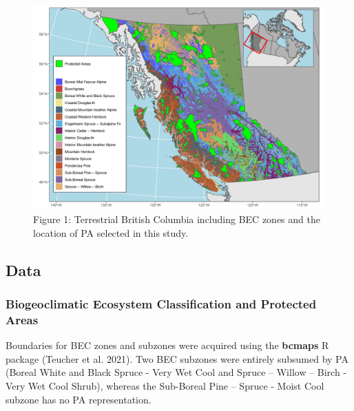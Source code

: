 \documentclass[10pt,oneside]{article}
\makeatletter
\def\maxwidth{\ifdim\Gin@nat@width>\linewidth\linewidth
\else\Gin@nat@width\fi}
\let\Oldincludegraphics\includegraphics
\renewcommand{\includegraphics}[1]{\Oldincludegraphics[width=\maxwidth]{#1}}
\makeatother
\begin{document}
\begin{figure}
\hypertarget{fig:study-area}{%
\centering
\includegraphics{figures/bec_map.png}
\caption{Figure 1: Terrestrial British Columbia including BEC zones and
the location of PA selected in this study.}\label{fig:study-area}
}
\end{figure}

\hypertarget{data}{%
\subsection{Data}\label{data}}

\hypertarget{biogeoclimatic-ecosystem-classification-and-protected-areas}{%
\subsubsection{Biogeoclimatic Ecosystem Classification and Protected
Areas}\label{biogeoclimatic-ecosystem-classification-and-protected-areas}}

Boundaries for BEC zones and subzones were acquired using the
\textbf{bcmaps} R package (Teucher et al. 2021). Two BEC subzones were
entirely subsumed by PA (Boreal White and Black Spruce - Very Wet Cool
and Spruce -- Willow -- Birch - Very Wet Cool Shrub), whereas the
Sub-Boreal Pine -- Spruce - Moist Cool subzone has no PA representation.
\end{document}
